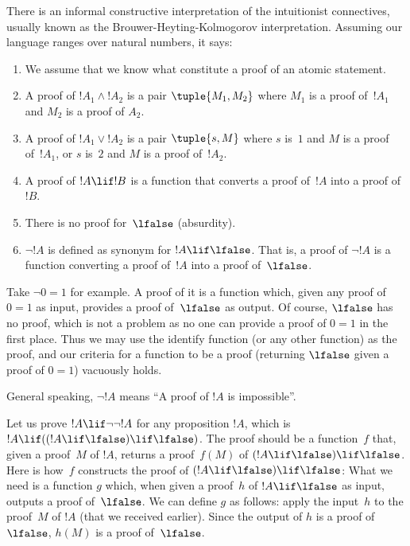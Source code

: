 \documentclass[../../../include/open-logic-section]{subfiles}
\begin{document}


There is an informal constructive interpretation of the intuitionist
connectives, usually known as the Brouwer-Heyting-Kolmogorov
interpretation. Assuming our language ranges over natural numbers, it says:
\begin{enumerate}
\item We assume that we know what constitute a proof of an atomic
  statement.
\item A proof of $!A_1 \land !A_2$ is a pair $\tuple{M_1, M_2}$ where
  $M_1$ is a proof of~$!A_1$ and $M_2$ is a proof of $A_2$.
\item A proof of $!A_1 \lor !A_2$ is a pair $\tuple{s, M}$ where $s$
  is~$1$ and $M$ is a proof of~$!A_1$, or $s$ is~$2$ and $M$ is a
  proof of~$!A_2$.
\item A proof of $!A \lif !B$ is a function that converts a proof
  of~$!A$ into a proof of~$!B$.
\item There is no proof for~$\lfalse$ (absurdity).
\item $\lnot !A$ is defined as synonym for $!A \lif \lfalse$. That is,
  a proof of $\lnot !A$ is a function converting a proof of~$!A$ into
  a proof of~$\lfalse$.
\end{enumerate}

\begin{ex}
Take $\lnot 0=1$ for example. A proof of it is a function which, given
any proof of $0=1$ as input, provides a proof of~$\lfalse$ as
output. Of course, $\lfalse$ has no proof, which is not a problem as
no one can provide a proof of $0=1$ in the first place. Thus we may
use the identify function (or any other function) as the proof, and
our criteria for a function to be a proof (returning $\lfalse$ given a
proof of $0=1$) vacuously holds.
\end{ex}

General speaking, $\lnot !A$ means ``A proof of $!A$ is impossible''.

\begin{ex}
Let us prove $!A \lif \lnot \lnot !A$ for any proposition $!A$, which
is $!A \lif ((!A \lif \lfalse) \lif \lfalse)$. The proof should be a
function~$f$ that, given a proof~$M$ of $!A$, returns a proof~$f(M)$
of $(!A \lif \lfalse) \lif \lfalse$. Here is how~$f$ constructs the
proof of $(!A \lif \lfalse) \lif \lfalse$: What we need is a function
$g$ which, when given a proof~$h$ of $!A \lif \lfalse$ as input,
outputs a proof of~$\lfalse$. We can define $g$ as follows: apply the
input~$h$ to the proof~$M$ of $!A$ (that we received earlier). Since
the output of $h$ is a proof of $\lfalse$, $h(M)$ is a proof
of~$\lfalse$.
\end{ex}
\end{document}
